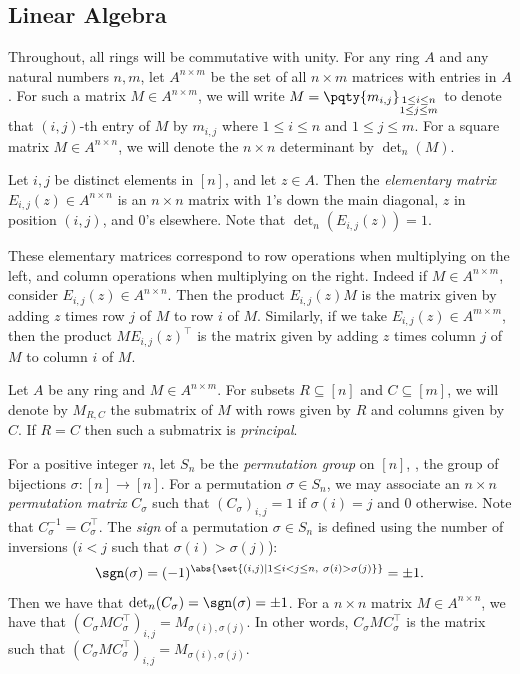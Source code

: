 \documentclass[letterpaper, 11pt]{amsart}
\begin{document}
\subsection{Linear Algebra}\label{sec:linalg}

Throughout, all rings will be commutative with unity.
For any ring $A$ and any natural numbers $n, m$, let $A^{n\times m}$ be the set of all $n\times m$ matrices with entries in $A$.
For such a matrix $M \in A^{n \times m}$, we will write $M = \pqty{m_{i, j}}_{\substack{1 \leq i \leq n \\ 1 \leq j \leq m}}$ to denote that $(i, j)$-th entry of $M$ by $m_{i, j}$ where $1 \leq i \leq n$ and $1 \leq j \leq m$.
For a square matrix $M \in A^{n \times n}$, we will denote the $n \times n$ determinant by $\det_n(M)$.

\begin{defn}\label{defn:elem_mat}
    Let $i,j$ be distinct elements in $[n]$, and let $z \in A$.
    Then the \emph{elementary matrix} $E_{i, j}(z) \in A^{n \times n}$ is an $n \times n$ matrix with $1$'s down the main diagonal, $z$ in position $(i, j)$, and $0$'s elsewhere.
    Note that $\det_n(E_{i, j}(z)) = 1$.

    These elementary matrices correspond to row operations when multiplying on the left, and column operations when multiplying on the right.
    Indeed if $M \in A^{n \times m}$, consider $E_{i, j}(z) \in A^{n \times n}$.
    Then the product $E_{i, j}(z) M$ is the matrix given by adding $z$ times row $j$ of $M$ to row $i$ of $M$.
    Similarly, if we take $E_{i, j}(z) \in A^{m \times m}$, then the product $M E_{i, j}(z)^{\top}$ is the matrix given by adding $z$ times column $j$ of $M$ to column $i$ of $M$.
\end{defn}

Let $A$ be any ring and $M \in A^{n\times m}$.
For subsets $R \subseteq [n]$ and $C \subseteq [m]$, we will denote by $M_{R, C}$ the submatrix of $M$ with rows given by $R$ and columns given by $C$.
If $R = C$ then such a submatrix is \emph{principal}.

For a positive integer $n$, let $S_n$ be the \emph{permutation group} on $[n]$, \ie, the group of bijections $\sigma\colon [n] \to [n]$.
For a permutation $\sigma \in S_n$, we may associate an $n \times n$ \emph{permutation matrix} $C_\sigma$ such that $(C_\sigma)_{i, j} = 1$ if $\sigma(i) = j$ and $0$ otherwise.
Note that $C_\sigma^{-1} = C_\sigma^{\top}$.
The \emph{sign} of a permutation $\sigma \in S_n$ is defined using the number of inversions ($i < j$ such that $\sigma(i) > \sigma(j)$):
\[
  \sgn(\sigma) = (-1)^{\abs{\set{(i, j) \mid 1 \leq i < j \leq n,\ \sigma(i) > \sigma(j)}}} = \pm 1.
\]
Then we have  that $\det_n(C_\sigma) = \sgn(\sigma) = \pm 1$.
For a $n \times n$ matrix $M \in A^{n \times n}$, we have that $(C_\sigma M C_\sigma^{\top})_{i, j} = M_{\sigma(i), \sigma(j)}$.
In other words, $C_\sigma M C_\sigma^{\top}$ is the matrix such that $(C_\sigma M C_\sigma^{\top})_{i, j} = M_{\sigma(i), \sigma(j)}$.
\end{document}
